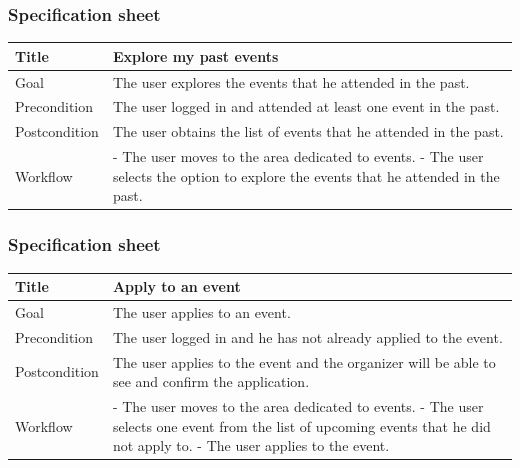 \documentclass{beamer}
\begin{document}
\begin{frame}
    \frametitle{Specification sheet}
    \begin{table}
        \tiny
        \begin{tabular}{|p{2cm}|p{6cm}|}
        \hline
        Title & \textbf{Explore my past events} \\
        \hline
        Goal & The user explores the events that he attended in the past. \\
        \hline
        Precondition & The user logged in and attended at least one event in the past. \\
        \hline
        Postcondition & The user obtains the list of events that he attended in the past. \\
        \hline
        Workflow &
        - The user moves to the area dedicated to events. \newline
        - The user selects the option to explore the events that he attended in the past. \\
        \hline
        \end{tabular}
    \end{table}
\end{frame}


\begin{frame}
    \frametitle{Specification sheet}
    \begin{table}
        \tiny
        \begin{tabular}{|p{2cm}|p{6cm}|}
        \hline
        Title & \textbf{Apply to an event} \\
        \hline
        Goal & The user applies to an event. \\
        \hline
        Precondition & The user logged in and he has not already applied to the event. \\
        \hline
        Postcondition & The user applies to the event and the organizer will be able to see and confirm the application. \\
        \hline
        Workflow &
        - The user moves to the area dedicated to events. \newline
        - The user selects one event from the list of upcoming events that he did not apply to. \newline
        - The user applies to the event. \\
        \hline
        \end{tabular}
    \end{table}
\end{frame}
\end{document}
